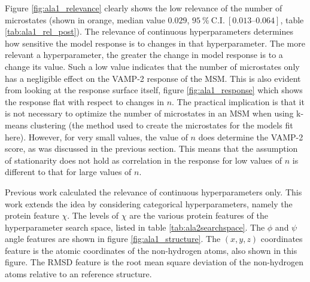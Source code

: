 Figure \ref{fig:ala1_relevance} clearly shows the low relevance of the number of microstates (shown in orange, median value $0.029$, $\SI{95}{\percent}\ \mathrm{C.I.}\ [\numrange[range-phrase=\text{--}]{0.013}{0.064}]$, table \ref{tab:ala1_rel_post}). The relevance of continuous hyperparameters  determines how sensitive the model response is to changes in that hyperparameter. The more relevant a hyperparameter, the  greater the change in model response is to a change its value.  Such a low value indicates that the number of microstates only has a negligible effect on the VAMP-2 response of the MSM. This is also evident from looking at the response surface itself, figure  \ref{fig:ala1_response} which shows the response flat with respect to changes in $n$. The practical implication is that it is not necessary to optimize the number of microstates in an MSM when using k-means clustering (the method used to create the microstates for the models fit here). However, for very small values, the value of $n$ does determine the VAMP-2 score, as was discussed in the previous section. This means that the assumption of stationarity does not hold as correlation in the response for low values of $n$ is different to that for large values of $n$. 

Previous work \cite{bergstrajamesbergstraRandomSearchHyperParameter2012} calculated the relevance of continuous hyperparameters only.  This work extends the idea by considering categorical hyperparameters, namely the protein feature $\chi$. The levels of $\chi$ are the various protein features of the hyperparameter search space, listed in table \ref{tab:ala2searchspace}. The $\phi$ and $\psi$ angle features are shown in figure \ref{fig:ala1_structure}. The $(x, y, z)$ coordinates feature is the atomic coordinates of the non-hydrogen atoms, also shown in this figure.  The RMSD feature is the root mean square deviation of the non-hydrogen atoms relative to an reference structure.

